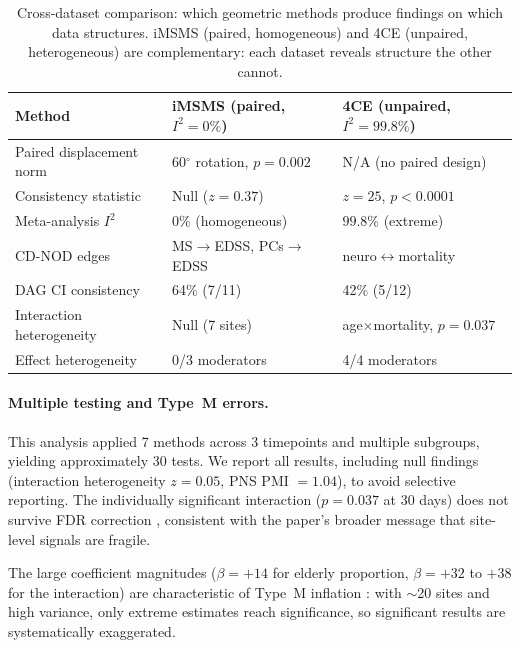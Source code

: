 \documentclass{article}
\begin{document}
\begin{table}[t]
\centering
\caption{Cross-dataset comparison: which geometric methods produce findings on which data structures. iMSMS (paired, homogeneous) and 4CE (unpaired, heterogeneous) are complementary: each dataset reveals structure the other cannot.}
\label{tab:cross_dataset}
\begin{tabular}{lll}
\toprule
Method & iMSMS (paired, $I^2=0\%$) & 4CE (unpaired, $I^2=99.8\%$) \\
\midrule
Paired displacement norm & 60$^{\circ}$ rotation, $p=0.002$ & N/A (no paired design) \\
Consistency statistic & Null ($z=0.37$) & $z=25$, $p < 0.0001$ \\
Meta-analysis $I^2$ & $0\%$ (homogeneous) & $99.8\%$ (extreme) \\
CD-NOD edges & MS$\to$EDSS, PCs$\to$EDSS & neuro$\leftrightarrow$mortality \\
DAG CI consistency & 64\% (7/11) & 42\% (5/12) \\
Interaction heterogeneity & Null (7 sites) & age$\times$mortality, $p=0.037$ \\
Effect heterogeneity & 0/3 moderators & 4/4 moderators \\
\bottomrule
\end{tabular}
\end{table}

\paragraph{Multiple testing and Type~M errors.}
This analysis applied 7 methods across 3 timepoints and multiple subgroups, yielding approximately 30 tests.
We report all results, including null findings (interaction heterogeneity $z = 0.05$, PNS PMI $= 1.04$), to avoid selective reporting.
The individually significant interaction ($p = 0.037$ at 30 days) does not survive FDR correction \cite{benjamini1995fdr}, consistent with the paper's broader message that site-level signals are fragile.

The large coefficient magnitudes ($\beta = +14$ for elderly proportion, $\beta = +32$ to $+38$ for the interaction) are characteristic of Type~M inflation \cite{gelman2014typeMS}: with $\sim$20 sites and high variance, only extreme estimates reach significance, so significant results are systematically exaggerated.
\end{document}
